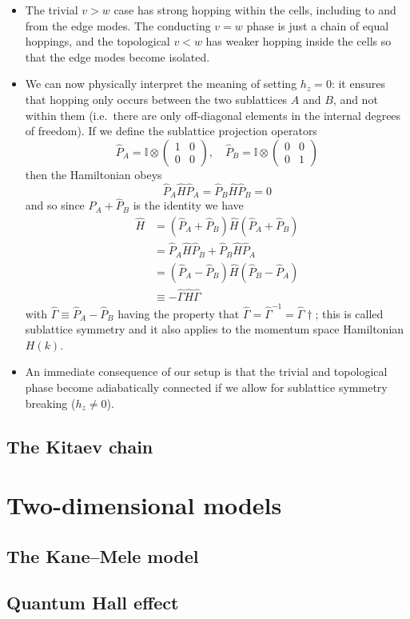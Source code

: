 {\begin{itemize}
	\item The trivial $v>w$ case has strong hopping within the cells, including to and from the edge modes. The conducting $v=w$ phase is just a chain of equal hoppings, and the topological $v<w$ has weaker hopping inside the cells so that the edge modes become isolated.
	
	\item We can now physically interpret the meaning of setting $h_z = 0$: it ensures that hopping only occurs between the two sublattices $A$ and $B$, and not within them (i.e.\ there are only off-diagonal elements in the internal degrees of freedom). If we define the sublattice projection operators
	\[
		\hat{P}_A = \mathbb{I} \otimes \begin{pmatrix}
			1 & 0 \\ 0 & 0
		\end{pmatrix},\quad \hat{P}_B = \mathbb{I} \otimes \begin{pmatrix}
		0 & 0 \\ 0 & 1
		\end{pmatrix}
	\]
	then the Hamiltonian obeys
	\[
		\hat{P}_A\hat{H}\hat{P}_A = \hat{P}_B\hat{H}\hat{P}_B = 0
	\]
	and so since $\hat{P}_A + \hat{P}_B$ is the identity we have
	\begin{align*}
		\hat{H} &= (\hat{P}_A + \hat{P}_B)\hat{H}(\hat{P}_A + \hat{P}_B) \\
			&= \hat{P}_A\hat{H}\hat{P}_B + \hat{P}_B\hat{H}\hat{P}_A \\
			&= (\hat{P}_A - \hat{P}_B)\hat{H}(\hat{P}_B - \hat{P}_A) \\
			&\equiv -\hat{\Gamma}\hat{H}\hat{\Gamma}
	\end{align*}
	with $\hat{\Gamma}\equiv\hat{P}_A - \hat{P}_B$ having the property that $\hat{\Gamma} = \hat{\Gamma}^{-1} = \hat{\Gamma}\dagger$; this is called sublattice symmetry and it also applies to the momentum space Hamiltonian $H(k)$.
	
	\item An immediate consequence of our setup is that the trivial and topological phase become adiabatically connected if we allow for sublattice symmetry breaking ($h_z \neq 0$).
\end{itemize}
}

\subsection{The Kitaev chain}


\section{Two-dimensional models}

\subsection{The Kane--Mele model}

\subsection{Quantum Hall effect}